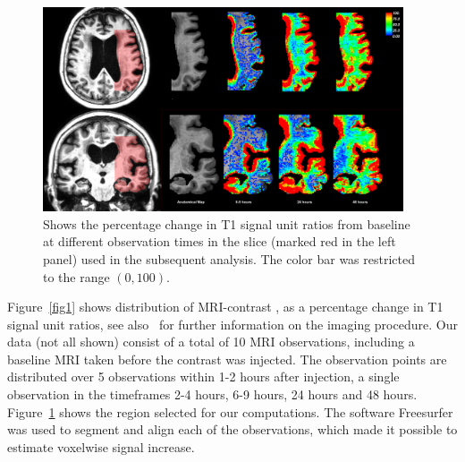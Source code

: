 \documentclass[12pt,a4paper]{article}
\begin{document}
\begin{figure}
\includegraphics[width=0.95\textwidth]{Zoom-PatID-68.png} 
\caption{Shows the percentage change in T1 signal unit ratios from baseline at different observation times in the slice (marked red in the left panel) used in the subsequent analysis. The color bar was restricted to the range $(0,100)$. }
\label{fig2} 
\end{figure}
Figure~\ref{fig1} shows distribution of MRI-contrast%
, as a percentage change in T1 signal unit ratios, see also~\cite{ringstad2018brain} for further information on the imaging procedure.   
Our data (not all shown) consist of a total of 10 MRI observations, including a baseline MRI taken before the contrast was injected. The observation points are distributed over 5 observations within 1-2 hours after injection, a single observation in the timeframes 2-4 hours, 6-9 hours, 24 hours and 48 hours. 
Figure~\ref{fig2} shows the region selected for our computations. 
The software Freesurfer \cite{Dale1999179, FischlLiuDale, spf2007, reuter:robreg10} was used to segment and align each of the observations, which made it possible to estimate voxelwise signal increase. 

\end{document}
